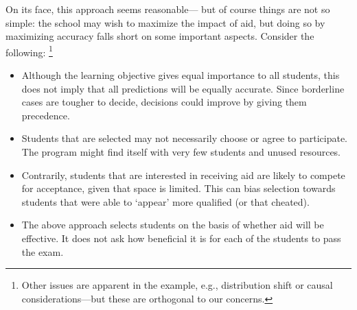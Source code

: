 On its face, this approach seems reasonable---%
but of course things are not so simple:
the school may wish to maximize the impact of aid,
but doing so by maximizing accuracy
falls short on some important aspects.
Consider the following:%
\footnote{Other issues are apparent in the example, e.g., distribution shift or causal considerations---but these are orthogonal to our concerns.
\squeeze
}
\begin{itemize}[leftmargin=1em,topsep=0em,itemsep=0.2em]
\item
Although the learning objective gives equal importance to all students,
this does not imply that all predictions will be equally accurate.
Since borderline cases are tougher to decide,
decisions could improve by giving them precedence.
\squeeze



\squeeze

\item 
Students that are selected may not necessarily choose or agree to participate.
The program might find itself with very few students and unused resources.
\squeeze

\item 
Contrarily, students that are interested in receiving aid are likely to compete for acceptance, given that space is limited.
This can bias selection towards students that were able to `appear' more qualified
(or that cheated).

\item
The above approach selects students on the basis of whether aid will be effective.
It does not ask 
how beneficial it is for each of the students to pass the exam. 


\end{itemize}
